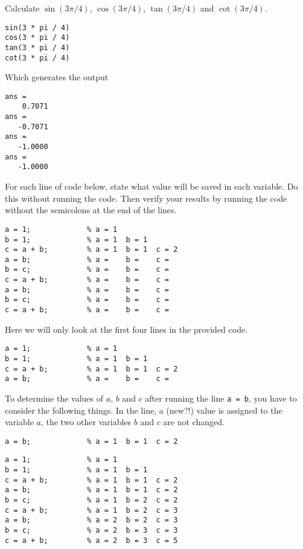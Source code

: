 \begin{ex}
Calculate $\sin(3 \pi / 4)$, $\cos(3 \pi / 4)$, $\tan(3 \pi /4)$ and $\cot(3 \pi / 4)$.
\begin{sol}
\begin{lstlisting}
sin(3 * pi / 4)
cos(3 * pi / 4)
tan(3 * pi / 4)
cot(3 * pi / 4)
\end{lstlisting}
Which generates the output
\begin{lstlisting}
ans =
    0.7071
ans =
   -0.7071
ans =
   -1.0000
ans =
   -1.0000
\end{lstlisting}
\end{sol}
\end{ex}


\begin{ex}
For each line of code below, state what value will be saved in each variable.
Do this without running the code.
Then verify your results by running the code without the semicolons at the 
end of the lines.
\begin{lstlisting}
a = 1;             % a = 1
b = 1;             % a = 1  b = 1 
c = a + b;         % a = 1  b = 1  c = 2
a = b;             % a =    b =    c = 
b = c;             % a =    b =    c = 
c = a + b;         % a =    b =    c = 
a = b;             % a =    b =    c = 
b = c;             % a =    b =    c = 
c = a + b;         % a =    b =    c = 
\end{lstlisting}
\begin{hint}
Here we will only look at the first four lines in the provided code.
\begin{lstlisting}
a = 1;             % a = 1
b = 1;             % a = 1  b = 1 
c = a + b;         % a = 1  b = 1  c = 2
a = b;             % a =    b =    c = 
\end{lstlisting}
To determine the values of $a$, $b$ and $c$ after running 
the line \verb!a = b!, you have to consider the following things.
In the line, a (new?!) value is assigned to the variable $a$, the
two other variables $b$ and $c$ are not changed.
\begin{lstlisting}
a = b;             % a = 1  b = 1  c = 2
\end{lstlisting}
\end{hint}
\begin{sol}
\begin{lstlisting}
a = 1;             % a = 1
b = 1;             % a = 1  b = 1 
c = a + b;         % a = 1  b = 1  c = 2
a = b;             % a = 1  b = 1  c = 2
b = c;             % a = 1  b = 2  c = 2
c = a + b;         % a = 1  b = 2  c = 3
a = b;             % a = 2  b = 2  c = 3
b = c;             % a = 2  b = 3  c = 3
c = a + b;         % a = 2  b = 3  c = 5
\end{lstlisting}
\end{sol}
\end{ex}




